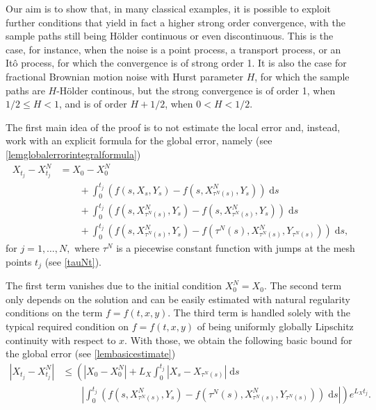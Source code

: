 \documentclass[reqno,12pt]{amsart}
\theoremstyle{plain}%
\theoremstyle{definition}
\begin{document}
Our aim is to show that, in many classical examples, it is possible to exploit further conditions that yield in fact a higher strong order convergence, with the sample paths still being H\"older continuous or even discontinuous. This is the case, for instance, when the noise is a point process, a transport process, or an It\^o process, for which the convergence is of strong order 1. It is also the case for fractional Brownian motion noise with Hurst parameter $H$, for which the sample paths are $H$-H\"older continous, but the strong convergence is of order 1, when $1/2 \leq H < 1$, and is of order $H + 1/2$, when $0 < H < 1/2$.

The first main idea of the proof is to not estimate the local error and, instead, work with an explicit formula for the global error, namely (see \cref{lemglobalerrorintegralformula})
\begin{equation}
    \label{lemglobalerrorintegralformulaintro}
    \begin{aligned}
        X_{t_j} - X_{t_j}^N & = X_0 - X_0^N \\
        & \qquad + \int_0^{t_j} \left( f(s, X_s, Y_s) - f(s, X_{\tau^N(s)}^N, Y_s) \right)\;\mathrm{d}s  \\ 
        & \qquad + \int_{0}^{t_j} \left( f(s, X_{\tau^N(s)}^N, Y_s) - f(s, X_{\tau^N(s)}^N, Y_s) \right)\;\mathrm{d}s \\
        & \qquad + \int_0^{t_j} \left( f(s, X_{\tau^N(s)}^N, Y_s) - f(\tau^N(s), X_{\tau^N(s)}^N, Y_{\tau^N(s)}) \right)\;\mathrm{d}s,
    \end{aligned}
\end{equation}
for $j = 1, \ldots, N,$ where $\tau^N$ is a piecewise constant function with jumps at the mesh points $t_j$ (see \cref{tauNt}).

The first term vanishes due to the initial condition $X_0^N = X_0$. The second term only depends on the solution and can be easily estimated with natural regularity conditions on the term $f=f(t, x, y)$. The third term is handled solely with the typical required condition on $f=f(t, x, y)$ of being uniformly globally Lipschitz continuity with respect to $x$. With those, we obtain the following basic bound for the global error (see \cref{lembasicestimate})
\begin{equation}
    \label{Etjbasicboundintro}
    \begin{aligned}
        |X_{t_j} - X_{t_j}^N| & \leq \left( |X_0 - X_0^N| + L_X \int_0^{t_j} |X_s - X_{\tau^N(s)}| \;\mathrm{d}s \right. \\
        & \qquad \left. \left|\int_0^{t_j} \left( f(s, X_{\tau^N(s)}^N, Y_s) - f(\tau^N(s), X_{\tau^N(s)}^N, Y_{\tau^N(s)}) \right)\;\mathrm{d}s\right|\right) e^{L_X t_j}.
    \end{aligned}
\end{equation}
\end{document}
